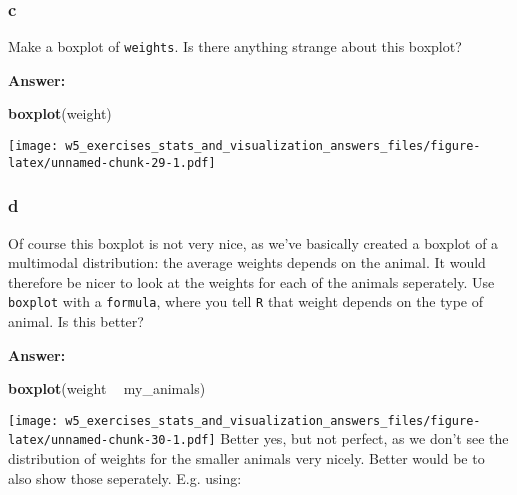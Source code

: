 \documentclass[]{article}
\newenvironment{Shaded}{\begin{snugshade}}{\end{snugshade}}
\newcommand{\KeywordTok}[1]{\textcolor[rgb]{0.13,0.29,0.53}{\textbf{#1}}}
\newcommand{\NormalTok}[1]{#1}
\newcommand{\OperatorTok}[1]{\textcolor[rgb]{0.81,0.36,0.00}{\textbf{#1}}}
\newcommand{\StringTok}[1]{\textcolor[rgb]{0.31,0.60,0.02}{#1}}
\begin{document}
\hypertarget{c-5}{%
\subsubsection{c}\label{c-5}}

Make a boxplot of \texttt{weights}. Is there anything strange about this
boxplot?

\textbf{Answer:}

\begin{Shaded}
\begin{Highlighting}[]
\KeywordTok{boxplot}\NormalTok{(weight)}
\end{Highlighting}
\end{Shaded}

\texttt{[image: w5\_exercises\_stats\_and\_visualization\_answers\_files/figure-latex/unnamed-chunk-29-1.pdf]}

\hypertarget{d-4}{%
\subsubsection{d}\label{d-4}}

Of course this boxplot is not very nice, as we've basically created a
boxplot of a multimodal distribution: the average weights depends on the
animal. It would therefore be nicer to look at the weights for each of
the animals seperately. Use \texttt{boxplot} with a \texttt{formula},
where you tell \texttt{R} that weight depends on the type of animal. Is
this better?

\textbf{Answer:}

\begin{Shaded}
\begin{Highlighting}[]
\KeywordTok{boxplot}\NormalTok{(weight }\OperatorTok{~}\StringTok{ }\NormalTok{my_animals)}
\end{Highlighting}
\end{Shaded}

\texttt{[image: w5\_exercises\_stats\_and\_visualization\_answers\_files/figure-latex/unnamed-chunk-30-1.pdf]}
Better yes, but not perfect, as we don't see the distribution of weights
for the smaller animals very nicely. Better would be to also show those
seperately. E.g. using:

\begin{Shaded}
\end{Shaded}
\end{document}
